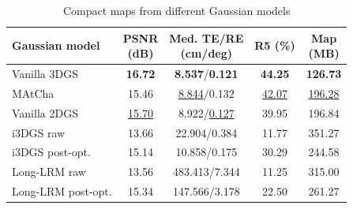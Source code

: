 \begin{table}[!t]
\centering
\footnotesize
\setlength{\tabcolsep}{1.7pt}
\renewcommand{\arraystretch}{1.15}
\caption{Compact maps from different Gaussian models}\label{tab:t8}
\begin{tabular*}{\linewidth}{@{\extracolsep{\fill}}lcccc@{}}
\toprule
Gaussian model & \shortstack{PSNR\\(dB)} & \shortstack{Med. TE/RE\\(cm/deg)} & R5 (\%) & \shortstack{Map\\(MB)} \\
\midrule
Vanilla 3DGS & \textbf{16.72} & \textbf{8.537}/\textbf{0.121} & \textbf{44.25} & \textbf{126.73} \\
MAtCha & 15.46 & \underline{8.844}/0.132 & \underline{42.07} & \underline{196.28} \\
Vanilla 2DGS & \underline{15.70} & 8.922/\underline{0.127} & 39.95 & 196.84 \\
i3DGS raw & 13.66 & 22.904/0.384 & 11.77 & 351.27 \\
i3DGS post-opt. & 15.14 & 10.858/0.175 & 30.29 & 244.58 \\
Long-LRM raw & 13.56 & 483.413/7.344 & 11.25 & 315.00 \\
Long-LRM post-opt. & 15.34 & 147.566/3.178 & 22.50 & 261.27 \\
\bottomrule
\end{tabular*}
\end{table}
